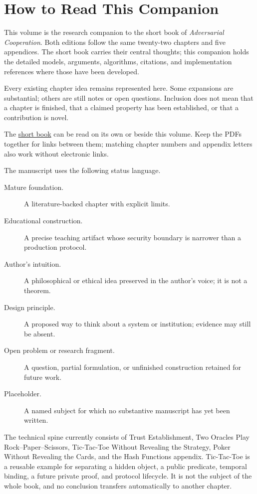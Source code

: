 \chapter*{How to Read This Companion}

This volume is the research companion to the short book of
\emph{Adversarial Cooperation}. Both editions follow the same twenty-two
chapters and five appendices. The short book carries their central thoughts;
this companion holds the detailed models, arguments, algorithms, citations,
and implementation references where those have been developed.

Every existing chapter idea remains represented here. Some expansions are
substantial; others are still notes or open questions. Inclusion does not mean
that a chapter is finished, that a claimed property has been established, or
that a contribution is novel.

The \href{Adversarial-Cooperation-Short.pdf}{short book} can be read on its own
or beside this volume. Keep the PDFs together for links between them; matching
chapter numbers and appendix letters also work without electronic links.

The manuscript uses the following status language.

\begin{description}
  \item[Mature foundation.] A literature-backed chapter with explicit limits.
  \item[Educational construction.] A precise teaching artifact whose security
  boundary is narrower than a production protocol.
  \item[Author's intuition.] A philosophical or ethical idea preserved in the
  author's voice; it is not a theorem.
  \item[Design principle.] A proposed way to think about a system or
  institution; evidence may still be absent.
  \item[Open problem or research fragment.] A question, partial formulation,
  or unfinished construction retained for future work.
  \item[Placeholder.] A named subject for which no substantive manuscript has
  yet been written.
\end{description}

The technical spine currently consists of Trust Establishment, Two Oracles
Play Rock--Paper--Scissors, Tic-Tac-Toe Without Revealing the Strategy, Poker
Without Revealing the Cards, and the Hash Functions appendix. Tic-Tac-Toe is a
reusable example for separating a hidden object, a public predicate, temporal
binding, a future private proof, and protocol lifecycle. It is not the subject
of the whole book, and no conclusion transfers automatically to another
chapter.

